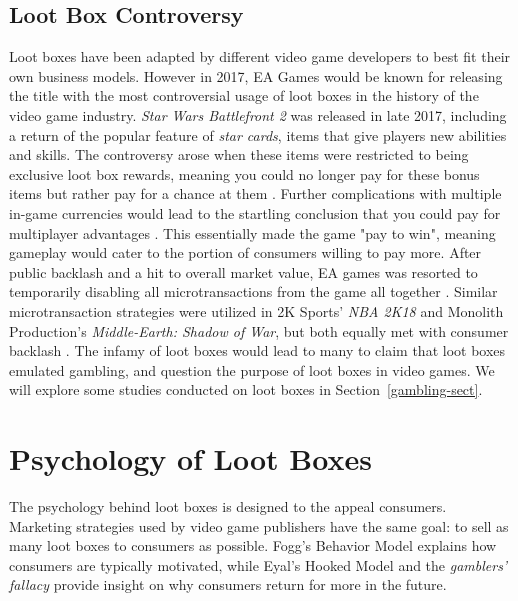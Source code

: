 \documentclass[11pt]{article}
\newcommand\genref[2]{#1~\ref{#2}}
\newcommand\sectref[1]{\genref{Section}{#1}}
\begin{document}
\subsection{Loot Box Controversy}\label{lootbox-contr-sect}
Loot boxes have been adapted by different video game developers to best fit their own business models. 
However in 2017, EA Games would be known for releasing the title with the most controversial usage of loot boxes
in the history of the video game industry. \textit{Star Wars Battlefront 2} was released in late 2017, 
including a return of the popular feature of \emph{star cards},
items that give players new abilities and skills. The controversy arose when these items 
were restricted to being exclusive loot box rewards, meaning you could no longer
pay for these bonus items but rather pay for a chance at them \cite{zendle_meyer_over_2019}. Further 
complications with multiple in-game currencies would lead to the startling  
conclusion that you could pay for multiplayer advantages \cite{zendle_meyer_over_2019}.
This essentially made the game "pay to win", meaning gameplay would cater to the portion of consumers
willing to pay more. After public backlash and a hit to overall market value, 
EA games was resorted to temporarily disabling all microtransactions from the game all together \cite{McCaffrey2019}. 
Similar microtransaction strategies were utilized in 2K Sports' \textit{NBA 2K18} and Monolith Production's
\textit{Middle-Earth: Shadow of War}, but both equally met with consumer backlash \cite{McCaffrey2019}.
The infamy of loot boxes would lead to many to claim that loot boxes emulated gambling,
and question the purpose of loot boxes in video games. We will explore some studies 
conducted on loot boxes in  \sectref{gambling-sect}.



\section{Psychology of Loot Boxes}\label{lootbox-psych-sect}
The psychology behind loot boxes is designed to the appeal consumers.
Marketing strategies used by video game publishers have the same goal: to sell
as many loot boxes to consumers as possible. Fogg's Behavior Model explains 
how consumers are typically motivated, while
Eyal's Hooked Model and the \emph{gamblers' fallacy} provide insight on
why consumers return for more in the future.
\end{document}
